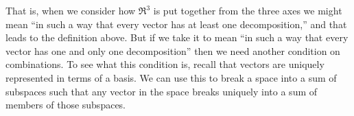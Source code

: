 



That is, when we consider how $\Re^3$ is put together from the three axes
we might mean ``in such a way that every vector 
has at least one decomposition,'' and that leads to the definition above.
But if we take it to mean 
``in such a way that every vector has one and only one
decomposition'' then we need another condition on combinations.
To see what this condition is, recall that
vectors are uniquely represented in terms of a basis.
We can use this to break a space into a sum of subspaces
such that any vector in the space breaks uniquely into a sum of members of
those subspaces.

